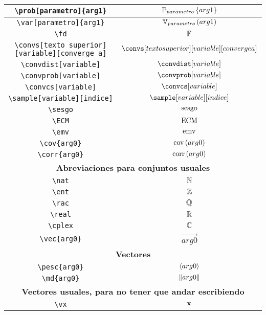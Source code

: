 \begin{longtable}{|c|c|}
\verb|\prob[parametro]{arg1}| & $\displaystyle\prob[parametro]{arg1}$ \\ \midrule 
\verb|\var[parametro]{arg1}| & $\displaystyle\var[parametro]{arg1}$ \\ \midrule 
\verb|\fd| & $\displaystyle\mathbb{F}$ \\ \midrule 
\verb|\convs[texto superior][variable][converge a]| & $\displaystyle\convs[texto superior][variable][converge a]$ \\ \midrule 
\verb|\convdist[variable]| & $\displaystyle\convdist[variable]$ \\ \midrule 
\verb|\convprob[variable]| & $\displaystyle\convprob[variable]$ \\ \midrule 
\verb|\convcs[variable]| & $\displaystyle\convcs[variable]$ \\ \midrule 
\verb|\sample[variable][indice]| & $\displaystyle\sample[variable][indice]$ \\ \midrule 
\verb|\sesgo| & $\displaystyle\operatorname{sesgo}$ \\ \midrule 
\verb|\ECM| & $\displaystyle\operatorname{ECM}$ \\ \midrule 
\verb|\emv| & $\displaystyle\operatorname{emv}$ \\ \midrule 
\verb|\cov{arg0}| & $\displaystyle\mathrm{cov}\left(arg0\right)$ \\ \midrule 
\verb|\corr{arg0}| & $\displaystyle\mathrm{corr}\left(arg0\right)$ \\ \midrule 
\bottomrule \multicolumn{2}{|c|}{\textbf{Abreviaciones para conjuntos usuales}} \\ \toprule 
\verb|\nat| & $\displaystyle\mathbb{N}$ \\ \midrule 
\verb|\ent| & $\displaystyle\mathbb{Z}$ \\ \midrule 
\verb|\rac| & $\displaystyle\mathbb{Q}$ \\ \midrule 
\verb|\real| & $\displaystyle\mathbb{R}$ \\ \midrule 
\verb|\cplex| & $\displaystyle\mathbb{C}$ \\ \midrule 
\verb|\vec{arg0}| & $\displaystyle\vec{arg0}$ \\ \midrule 
\bottomrule \multicolumn{2}{|c|}{\textbf{Vectores}} \\ \toprule 
\verb|\pesc{arg0}| & $\displaystyle\langle arg0 \rangle$ \\ \midrule 
\verb|\md{arg0}| & $\displaystyle\| arg0 \|$ \\ \midrule 
\bottomrule \multicolumn{2}{|c|}{\textbf{Vectores usuales, para no tener que andar escribiendo}} \\ \toprule 
\verb|\vx| & $\displaystyle\bold{x}$ \\ \midrule 

\end{longtable}
